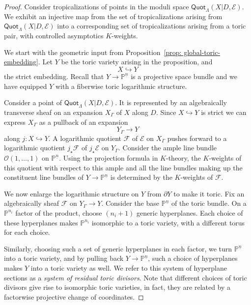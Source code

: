 \documentclass[11pt]{amsart}
\theoremstyle{definition}
\theoremstyle{definition}
\begin{document}
\begin{proof}
Consider tropicalizations of points in the moduli space $\mathsf{Quot}_\Lambda(X|D,\mathcal E)$. We exhibit an injective map from the set of tropicalizations arising from $\mathsf{Quot}_\Lambda(X|D,\mathcal E)$ into a corresponding set of tropicalizations arising from a toric pair, with controlled asymptotics $K$-weights. 

We start with the geometric input from Proposition~\ref{prop: global-toric-embedding}. Let $Y$ be the toric variety arising in the proposition, and 
\[
X\hookrightarrow Y
\]
the strict embedding. Recall that $Y\to \mathbb P^{\underline n}$ is a projective space bundle and we have equipped $Y$ with a fiberwise toric logarithmic structure. 

Consider a point of $\mathsf{Quot}_\Lambda(X|D,\mathcal E)$. It is represented by an algebraically transverse sheaf on an expansion $X_\Gamma$ of $X$ along $D$. Since $X\hookrightarrow Y$ is strict we can express $X_\Gamma$ as a pullback of an expansion
\[
Y_\Gamma\to Y
\]
along $j\colon X\hookrightarrow Y$. A logarithmic quotient $\mathcal F$ of $\mathcal E$ on $X_\Gamma$ pushes forward to a logarithmic quotient $j_\star\mathcal F$ of $j_\star\mathcal E$ on $Y_\Gamma$. Consider the ample line bundle $\mathcal O(1,\ldots,1)$ on $\mathbb P^{\underline n}$. Using the projection formula in $K$-theory, the $K$-weights of this quotient with respect to this ample and all the line bundles making up the constituent line bundles of $Y\to \mathbb P^{\underline n}$ is determined by the $K$-weights of $\mathcal F$.  

We now enlarge the logarithmic structure on $Y$ from $\partial Y$ to make it toric. Fix an algebraically sheaf $\mathcal F$ on $Y_\Gamma\to Y$. Consider the base $\mathbb P^{\underline n}$ of the toric bundle. On a $\mathbb P^{n_i}$ factor of the product, choose $(n_i+1)$ generic hyperplanes. Each choice of these hyperplanes makes $\mathbb P^{n_i}$ isomorphic to a toric variety, with a different torus for each choice. 

Similarly, choosing such a set of generic hyperplanes in each factor, we turn $\mathbb P^{\underline n}$ into a toric variety, and by pulling back $Y\to \mathbb P^{\underline n}$, such a choice of hyperplanes makes $Y$ into a toric variety as well. We refer to this system of hyperplane sections as a {\it system of residual toric divisors}. Note that different choices of toric divisors give rise to isomorphic toric varieties, in fact, they are related by a factorwise projective change of coordinates. 


\end{proof}
\end{document}
